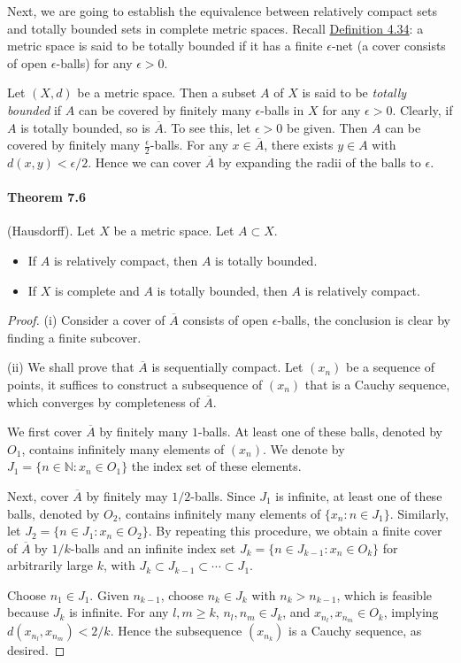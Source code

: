 \documentclass{article}
\numberwithin{equation}{section}
\theoremstyle{plain}
\theoremstyle{definition}
\begin{document}
Next, we are going to establish the equivalence between relatively compact sets and totally bounded sets in complete metric spaces. Recall \hyperref[def:4.34]{Definition 4.34}: a metric space is said to be totally bounded if it has a finite $\epsilon$-net (a cover consists of open $\epsilon$-balls) for any $\epsilon > 0$.

Let $(X,d)$ be a metric space. Then a subset $A$ of $X$ is said to be \textit{totally bounded} if $A$ can be covered by finitely many $\epsilon$-balls in $X$ for any $\epsilon > 0$. Clearly, if $A$ is totally bounded, so is $\overline{A}$. To see this, let $\epsilon > 0$ be given. Then $A$ can be covered by finitely many $\frac{\epsilon}{2}$-balls. For any $x\in\overline{A}$, there exists $y\in A$ with $d(x,y)<\epsilon / 2$. Hence we can cover $\overline{A}$ by expanding the radii of the balls to $\epsilon$.

\paragraph{Theorem 7.6\label{thm:7.6}} (Hausdorff). Let $X$ be a metric space. Let $A\subset X$.
\begin{itemize}
	\item[(i)] If $A$ is relatively compact, then $A$ is totally bounded.
	\item[(ii)] If $X$ is complete and $A$ is totally bounded, then $A$ is relatively compact.
\end{itemize}
\begin{proof}
(i) Consider a cover of $\overline{A}$ consists of open $\epsilon$-balls, the conclusion is clear by finding a finite subcover.

(ii) We shall prove that $\overline{A}$ is sequentially compact. Let $(x_n)$ be a sequence of points, it suffices to construct a subsequence of $(x_n)$ that is a Cauchy sequence, which converges by completeness of $\overline{A}$.

We first cover $\overline{A}$ by finitely many $1$-balls. At least one of these balls, denoted by $O_1$, contains infinitely many elements of $(x_n)$. We denote by $J_1=\{n\in\mathbb{N}:x_n\in O_1\}$ the index set of these elements.

Next, cover $\overline{A}$ by finitely may $1/2$-balls. Since $J_1$ is infinite, at least one of these balls, denoted by $O_2$, contains infinitely many elements of $\{x_n:n\in J_1\}$. Similarly, let $J_2=\{n\in J_1:x_n\in O_2\}$. By repeating this procedure, we obtain a finite cover of $\overline{A}$ by $1/k$-balls and an infinite index set $J_k=\{n\in J_{k-1}:x_n\in O_{k}\}$ for arbitrarily large $k$, with $J_k\subset J_{k-1}\subset\cdots\subset J_1$.

Choose $n_1\in J_1$. Given $n_{k-1}$, choose $n_k\in J_k$ with $n_k > n_{k-1}$, which is feasible because $J_k$ is infinite. For any $l,m\geq k$, $n_l,n_m\in J_k$, and $x_{n_l},x_{n_m}\in O_k$, implying $d(x_{n_l},x_{n_m})<2/k$. Hence the subsequence $(x_{n_k})$ is a Cauchy sequence, as desired.
\end{proof}
\end{document}
